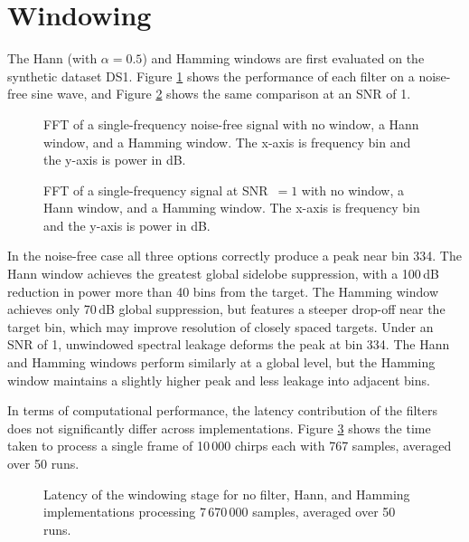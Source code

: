 \section{Windowing}
The Hann (with $\alpha = 0.5$) and Hamming windows are first evaluated on the synthetic dataset DS1. 
Figure \ref{fig:clean filters} shows the
performance of each filter on a noise-free sine wave, and Figure \ref{fig:noisy filters}
shows the same comparison at an SNR of 1.

\begin{figure}
    \caption[Window filter comparison on a noise-free signal.]{FFT of a single-frequency
    noise-free signal with no window, a Hann window, and a Hamming window. The x-axis is
    frequency bin and the y-axis is power in dB.}
    \label{fig:clean filters}
\end{figure}

\begin{figure}
    \caption[Window filter comparison at SNR of 1.]{FFT of a single-frequency signal at
    SNR~$= 1$ with no window, a Hann window, and a Hamming window. The x-axis is frequency
    bin and the y-axis is power in dB.}
    \label{fig:noisy filters}
\end{figure}

In the noise-free case all three options correctly produce a peak near bin 334. The Hann
window achieves the greatest global sidelobe suppression, with a 100\,dB reduction in power
more than 40 bins from the target. The Hamming window achieves only 70\,dB global
suppression, but features a steeper drop-off near the target bin, which may improve
resolution of closely spaced targets. Under an SNR of 1, unwindowed spectral leakage
deforms the peak at bin 334. The Hann and Hamming windows perform similarly at a global
level, but the Hamming window maintains a slightly higher peak and less leakage into
adjacent bins.

In terms of computational performance, the latency contribution of the filters does not
significantly differ across implementations. Figure \ref{fig:latency} shows the time
taken to process a single frame of 10\,000 chirps each with 767 samples, averaged over
50 runs.

\begin{figure}
    \caption[Windowing stage latency across implementations.]{Latency of the windowing
    stage for no filter, Hann, and Hamming implementations processing 7\,670\,000 samples,
    averaged over 50 runs.}
    \label{fig:latency}
\end{figure}

